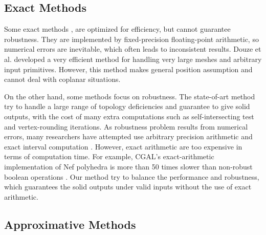 \subsection{Exact Methods}


Some exact methods \cite{ogayar2015deferred,douze2015quickcsg,xu2013fast,feito2013fast,updegrove2016boolean}, are optimized for efficiency, but cannot guarantee robustness. They are implemented by fixed-precision floating-point arithmetic, so numerical errors are inevitable, which often leads to inconsistent results.
Douze et al. \cite{douze2015quickcsg} developed a very efficient method for handling very large meshes and arbitrary input primitives. However, this method makes general position assumption and cannot deal with coplanar situations.


On the other hand, some methods focus on robustness. The state-of-art method \cite{zhou2016mesh} try to handle a large range of topology deficiencies and guarantee to give solid outputs, with the cost of many extra computations such as self-intersecting test and vertex-rounding iterations.
As robustness problem results from numerical errors, many researchers have attempted use arbitrary precision arithmetic \cite{banerjee1996topologically, fortune1995polyhedral, keyser2004esolid, granados2003boolean, hachenberger2005boolean, zhou2016mesh,barki2015exact} and exact interval computation \cite{fang1993robustness, hu1996robust, segal1990using}. However, exact arithmetic are too expensive in terms of computation time. For example, CGAL's \cite{cgal:hk-bonp3-15a} exact-arithmetic implementation \cite{granados2003boolean} of Nef polyhedra \cite{bieri1988elementary} is more than 50 times slower than non-robust boolean operations \cite{bernstein2009fast}. Our method try to balance the performance and robustness, which guarantees the solid outputs under valid inputs without the use of exact arithmetic.


\subsection{Approximative Methods}


